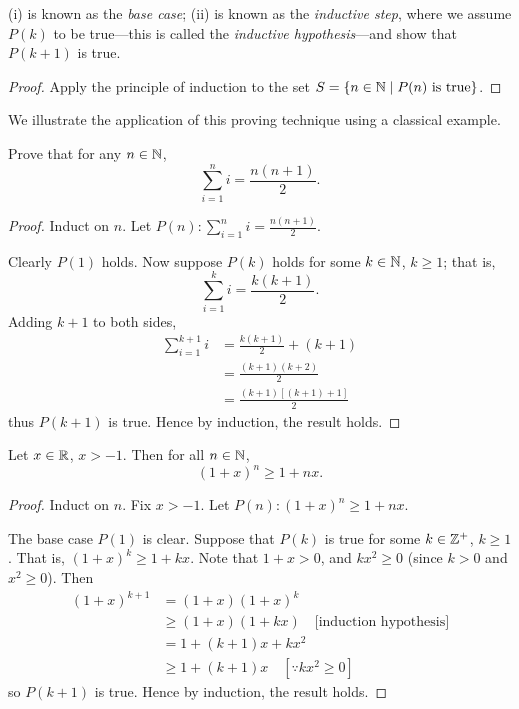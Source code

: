 (i) is known as the \emph{base case}; (ii) is known as the \emph{inductive step}, where we assume $P(k)$ to be true---this is called the \emph{inductive hypothesis}---and show that $P(k+1)$ is true.

\begin{proof}
Apply the principle of induction to the set $S=\{n\in\mathbb N\mid P(n)\text{ is true}\}$.
\end{proof}

We illustrate the application of this proving technique using a classical example.

\begin{example}
Prove that for any $n\in\mathbb N$,
\[\sum_{i=1}^n i=\frac{n(n+1)}{2}.\]

\begin{proof}
Induct on $n$. Let $\displaystyle P(n):\sum_{i=1}^n i=\frac{n(n+1)}{2}$.

Clearly $P(1)$ holds. Now suppose $P(k)$ holds for some $k\in\mathbb N$, $k\ge1$; that is,
\[\sum_{i=1}^k i=\frac{k(k+1)}{2}.\]
Adding $k+1$ to both sides,
\begin{align*}
\sum_{i=1}^{k+1} i&=\frac{k(k+1)}{2}+(k+1)\\
&=\frac{(k+1)(k+2)}{2}\\
&=\frac{(k+1)[(k+1)+1]}{2}
\end{align*}
thus $P(k+1)$ is true. Hence by induction, the result holds.
\end{proof}
\end{example}

\begin{example}
Let $x\in\mathbb R$, $x>-1$. Then for all $n\in\mathbb N$,
\[(1+x)^n\ge1+nx.\]

\begin{proof}
Induct on $n$. Fix $x>-1$. Let $P(n):(1+x)^n\ge1+nx$.

The base case $P(1)$ is clear. Suppose that $P(k)$ is true for some $k\in\mathbb Z^+$, $k\ge1$. That is, $(1+x)^k\ge1+kx$. Note that $1+x>0$, and $kx^2\ge0$ (since $k>0$ and $x^2\ge0$). Then
\begin{align*}
(1+x)^{k+1}&=(1+x)(1+x)^k\\
&\ge(1+x)(1+kx)\quad\text{[induction hypothesis]}\\
&=1+(k+1)x+kx^2\\
&\ge1+(k+1)x\quad[\because kx^2\ge0]
\end{align*}
so $P(k+1)$ is true. Hence by induction, the result holds.
\end{proof}
\end{example}

